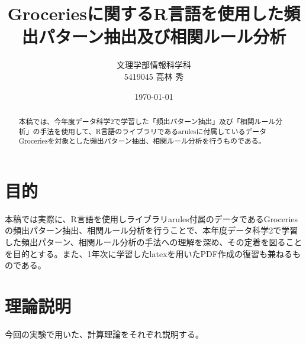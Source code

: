 \documentclass[dvipdfmx]{jsarticle}
\title{Groceriesに関するR言語を使用した頻出パターン抽出及び相関ルール分析}
\author{文理学部情報科学科\\5419045 高林 秀}
\date{\today}
\begin{document}
\maketitle

\begin{abstract}
  本稿では、今年度データ科学2で学習した「頻出パターン抽出」及び「相関ルール分析」の手法を使用して、R言語のライブラリであるarulesに付属しているデータGroceriesを対象とした頻出パターン抽出、相関ルール分析を行うものである。

\end{abstract}

\section{目的}
本稿では実際に、R言語を使用しライブラリarules付属のデータであるGroceriesの頻出パターン抽出、相関ルール分析を行うことで、本年度データ科学2で学習した頻出パターン、相関ルール分析の手法への理解を深め、その定着を図ることを目的とする。また、1年次に学習したlatexを用いたPDF作成の復習も兼ねるものである。
\section{理論説明}
今回の実験で用いた、計算理論をそれぞれ説明する。
\end{document}
